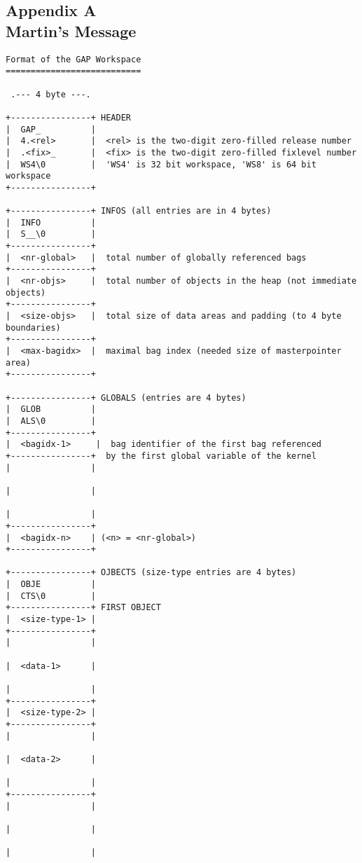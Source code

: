 \documentclass[11pt]{article}
\begin{document}
\begin{small}
\section*{Appendix A\\ Martin's Message}



\begin{verbatim}
Format of the GAP Workspace
===========================

 .--- 4 byte ---.

+----------------+ HEADER
|  GAP_          |
|  4.<rel>       |  <rel> is the two-digit zero-filled release number
|  .<fix>_       |  <fix> is the two-digit zero-filled fixlevel number
|  WS4\0         |  'WS4' is 32 bit workspace, 'WS8' is 64 bit workspace
+----------------+

+----------------+ INFOS (all entries are in 4 bytes)
|  INFO          |
|  S__\0         |
+----------------+
|  <nr-global>   |  total number of globally referenced bags
+----------------+
|  <nr-objs>     |  total number of objects in the heap (not immediate objects)
+----------------+
|  <size-objs>   |  total size of data areas and padding (to 4 byte boundaries)
+----------------+
|  <max-bagidx>  |  maximal bag index (needed size of masterpointer area)
+----------------+

+----------------+ GLOBALS (entries are 4 bytes)
|  GLOB          |
|  ALS\0         |
+----------------+
|  <bagidx-1>     |  bag identifier of the first bag referenced
+----------------+  by the first global variable of the kernel
|                |

|                |

|                |
+----------------+
|  <bagidx-n>    | (<n> = <nr-global>)
+----------------+

+----------------+ OJBECTS (size-type entries are 4 bytes)
|  OBJE          |
|  CTS\0         |
+----------------+ FIRST OBJECT
|  <size-type-1> |
+----------------+
|                |

|  <data-1>      |

|                |
+----------------+
|  <size-type-2> |
+----------------+
|                |

|  <data-2>      |

|                |
+----------------+
|                |

|                |

|                |


\end{verbatim}
\end{small}
\end{document}
